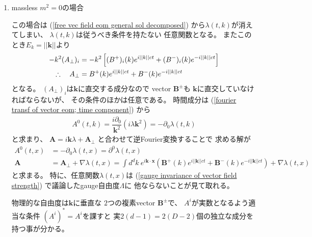 \begin{enumerate}
\renewcommand{\labelenumi}{(\roman{enumi})}
\item {massless $m^2 = 0$の場合}

    この場合は
    (\ref{free vec field eom general sol decomposed})
    から$\lambda(t, k)$が消えてしまい、
    $\lambda(t, k)$は従うべき条件を持たない
    任意関数となる。
    またこのとき$E_k = ||\bm{k}||$より
    \begin{align}
        - k^2
        (A_\perp)_i
    &=
    - k^2
    \left[
        (B^+)_i (k) e^{i ||k|| c t}
    +
        (B^-)_i (k) e^{- i ||k|| c t}
    \right]
    \notag\\\therefore\quad
        A_\perp
    &=
        B^+ (k) e^{i ||k|| c t}
    +
        B^- (k) e^{- i ||k|| c t}
    \end{align}
    となる。
    $(A_\perp)_i$は$\bm{k}$に直交する成分なので
    vector $\bm{B}^\pm$も
    $\bm{k}$に直交していなければならないが、
    その条件のほかは任意である。
    時間成分は
    (\ref{fourier transf of vector eom; time component})
    から
    \begin{align}
        A^0 (t, k)
    =
        \dfrac{i \partial_0}
            {\bm{k}^2}
        (i \lambda \bm{k}^2)
    =
        - \partial_0 \lambda (t, k)
    \end{align}
    と求まり、
    $\bm{A}
    = i \bm{k} \lambda
        + \bm{A}_\perp$
    と合わせて逆Fourier変換することで
    求める解が
    \begin{subequations}
    \begin{align}
        A^0 (t, x)
    &=
        - \partial_0 \lambda (t, x)
    =
        \partial^0 \lambda (t, x)
    \\
        \bm{A}
    &=
        \bm{A}_\perp
    +
        \nabla \lambda(t, x)
    =
        \int d^d k\ 
        e^{i \bm{k} \cdot \bm{x}}
        \left(
            \bm{B}^+ (k) e^{i ||\bm{k}|| c t}
        +
            \bm{B}^- (k) e^{- i ||\bm{k}|| c t}
        \right)
    +
        \nabla \lambda(t, x)
    \end{align}
    \end{subequations}
    と求まる。
    特に、任意関数$\lambda(t, x)$は
    (\ref{gauge invariance of vector field strength})
    で議論したgauge自由度$\Lambda$に
    他ならないことが見て取れる。

    物理的な自由度は$\bm{k}$に垂直な
    $2$つの複素vector $\bm{B}^\pm$で、
    $A^i$が実数となるよう適当な条件
    $(A^i)^* = A^i$を課すと
    実$2(d-1) = 2(D-2)$個の独立な成分を持つ事が分かる。


\end{enumerate}
